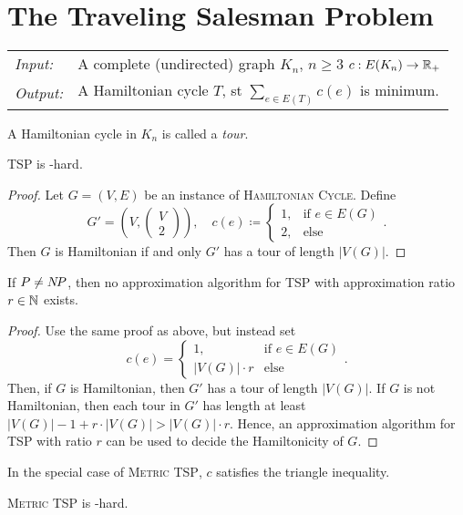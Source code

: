\documentclass[../skript.tex]{subfiles}
\begin{document}
\chapter{The Traveling Salesman Problem} %
\label{sec:c6}
\begin{problem}
\begin{tabular}{@{}ll}
\textit{Input:} & A complete (undirected) graph $K_n$, $n \geq 3$ $c : E(K_n) \to \mathbb{R}_+$ \\
\textit{Output:} & A Hamiltonian cycle $T$, \ac{st} $\sum_{e \in E(T)} c(e)$ is minimum.
\end{tabular}
\end{problem}
A Hamiltonian cycle in $K_n$ is called a \emph{tour}.
\begin{theorem} %
TSP is \NP-hard.
\end{theorem}
\begin{proof}
Let $G = (V, E)$ be an instance of \textsc{Hamiltonian Cycle}.
Define
\[
	G' = \left( V, \begin{pmatrix}
	V \\ 2
	\end{pmatrix} \right), \quad c(e) \coloneqq \begin{cases}
	1, & \text{if } e \in E(G) \\
	2, & \text{else}
	\end{cases}.
\]
Then $G$ is Hamiltonian if and only $G'$ has a tour of length $|V(G)|$.
\end{proof}
\begin{theorem} %
If $P \neq N \! P$, then no approximation algorithm for TSP with approximation ratio $r \in \mathbb{N}$ exists.
\end{theorem}
\begin{proof}
Use the same proof as above, but instead set
\[
	c(e) = \begin{cases}
	1, & \text{if } e \in E(G) \\
	|V(G)| \cdot r & \text{else}
	\end{cases}.
\]
Then, if $G$ is Hamiltonian, then $G'$ has a tour of length $|V(G)|$. If $G$ is not Hamiltonian, then each tour in $G'$ has length at least $|V(G)| - 1 + r \cdot |V(G)| > |V(G)| \cdot r$.
Hence, an approximation algorithm for TSP with ratio $r$ can be used to decide the Hamiltonicity of $G$.
\end{proof}
In the special case of \textsc{Metric TSP}, $c$ satisfies the triangle inequality.
\begin{theorem} %
\textsc{Metric TSP} is \NP-hard.
\end{theorem}
\end{document}
